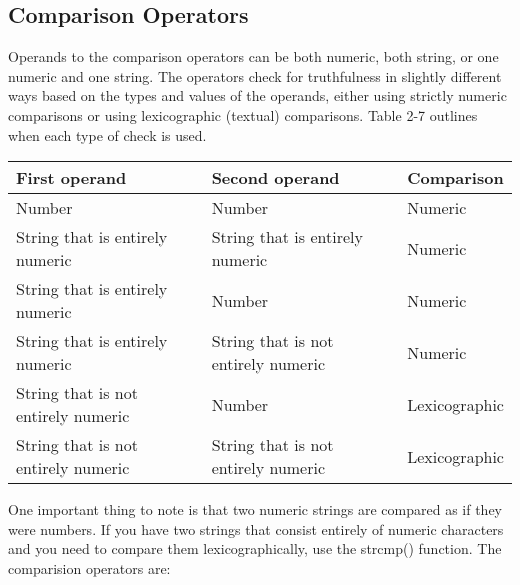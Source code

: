 \documentclass{report}
\begin{document}
\subsection{Comparison Operators}
\bigbreak \noindent 
Operands to the comparison operators can be both numeric, both string, or one numeric and one string. The operators check for truthfulness in slightly different ways
based on the types and values of the operands, either using strictly numeric comparisons or using lexicographic (textual) comparisons. Table 2-7 outlines when each type
of check is used.
\bigbreak \noindent 
\begin{center}
    \begin{tabular}{p{4cm}|p{4cm}|p{4cm}}
        First operand &Second operand &Comparison \\
        \hline
        Number &Number &Numeric \\
        String that is entirely numeric &String that is entirely numeric &Numeric \\
        String that is entirely numeric &Number &Numeric \\
        String that is entirely numeric &String that is not entirely numeric &Numeric \\
        String that is not entirely numeric &Number &Lexicographic \\
        String that is not entirely numeric &String that is not entirely numeric &Lexicographic
    \end{tabular}
\end{center}
\bigbreak \noindent 
One important thing to note is that two numeric strings are compared as if they were numbers. If you have two strings that consist entirely of numeric characters and you need to compare them lexicographically, use the strcmp() function.
\bigbreak \noindent 
The comparision operators are:
\bigbreak \noindent 
\end{document}

